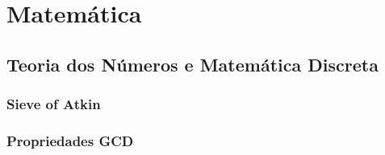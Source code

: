 \section{Matemática}

\subsection{Teoria dos Números e Matemática Discreta}

\subsubsection{Sieve of Atkin}
\divisor

\subsubsection{Propriedades GCD}
